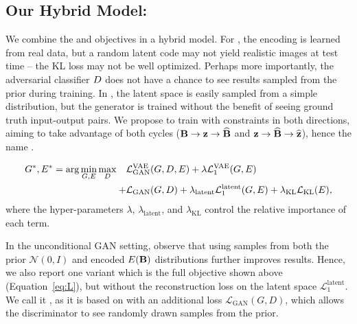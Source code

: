 \subsection{Our Hybrid Model: \bicycle}
\label{sec:finalMethod}
We combine the \cvaegan and \cinfogan objectives in a hybrid model. For \cvaegan, the encoding is learned from real data, but a random latent code may not yield realistic images at test time -- the KL loss may not be well optimized. Perhaps more importantly, the adversarial classifier $D$ does not have a chance to see results sampled from the prior during training. 
In \cinfogan, the latent space is easily sampled from a simple distribution, but the generator is trained without the benefit of seeing ground truth input-output pairs. We propose to train with constraints in both directions, aiming to take advantage of both cycles ($\mathbf{B} \rightarrow \mathbf{z} \rightarrow \widehat{\mathbf{B}}$ and $\mathbf{z} \rightarrow \widehat{\mathbf{B}} \rightarrow \widehat{\mathbf{z}}$), hence the name \bicycle.

\vspace{-3mm}
\begin{equation}
\begin{split}
G^{*}, E^{*} = \arg\min_{G,E} \max_{D} \quad  & \mathcal{L}_{\text{GAN}}^{\text{VAE}}(G,D,E) + \lambda \mathcal{L}_1^{\text{VAE}}(G,E) \\
+& \mathcal{L}_{\text{GAN}}(G,D) + \lambda_{\text{latent}} \mathcal{L}_1^{\text{latent}}(G,E) + \lambda_{\text{KL}}\mathcal{L}_{\text{KL}}(E),
\end{split}
\label{eq:L}
\end{equation}
where the hyper-parameters $\lambda$, $\lambda_{\text{latent}}$, and $\lambda_{\text{KL}}$ control the relative importance of each term. 

In the unconditional GAN setting, \citet{larsen2016vaegan} observe that using samples from both the prior $\mathcal{N}(0,I)$ and encoded $E(\mathbf{B})$ distributions further improves results.
Hence, we also report one variant which is the full objective shown above (Equation~\ref{eq:L}), but without the reconstruction loss on the latent space $\mathcal{L}_1^{\text{latent}}$. 
We call it \cvaeganp, as it is based on \cvaegan with an additional loss $\mathcal{L}_{\text{GAN}}(G, D)$, which allows the discriminator to see randomly drawn samples from the prior.
\vspace{-2mm}